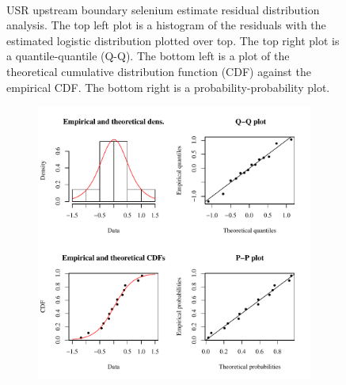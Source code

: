 \begin{landscape}
\begin{figure}
\begin{subfigure}{0.7\textwidth}
		\end{subfigure}\\
		\caption[USR upstream boundary selenium estimate residual distribution analysis.]{USR upstream boundary selenium estimate residual distribution analysis.  The top left plot is a histogram of the residuals with the estimated logistic distribution plotted over top.  The top right plot is a quantile-quantile (Q-Q).  The bottom left is a plot of the theoretical cumulative distribution function (CDF) against the empirical CDF.  The bottom right is a probability-probability plot.}
		\label{fig:concRes-Fit_US}
	\end{figure}
\end{landscape}

\subfiguremid
\begin{landscape}
	\begin{figure}
		\begin{subfigure}{0.7\textwidth}
			\centering
			\includegraphics[width=\tableCustomSize]{"Figures/Results_USR/Stochastic/Conc Model res-fit U167"}
		\end{subfigure}%
		\begin{subfigure}{0.7\textwidth}
			\centering

\end{subfigure}
\end{figure}
\end{landscape}
